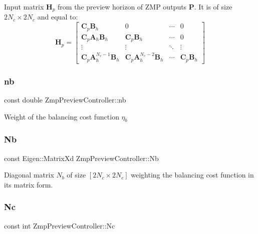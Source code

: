 Input matrix $\mathbf{H}_p$ from the preview horizon of Z\+MP outputs $\mathbf{P}$. It is of size $2N_c \times 2N_c$ and equal to\+: \[ \mathbf{H}_p = \left[\begin{array}{cccc} \mathbf{C}_p\mathbf{B}_h & 0 & \cdots & 0 \\ \mathbf{C}_p\mathbf{A}_h\mathbf{B}_h & \mathbf{C}_p\mathbf{B}_h & \cdots & 0 \\ \vdots & \vdots & \ddots & \vdots \\ \mathbf{C}_p\mathbf{A}^{N_c-1}_h\mathbf{B}_h & \mathbf{C}_p\mathbf{A}^{N_c-2}_h\mathbf{B}_h & \cdots & \mathbf{C}_p\mathbf{B}_h \end{array}\right] \] \hypertarget{classZmpPreviewController_a6716ee4c94e6f91e608ee1e29fbc7051}{}\label{classZmpPreviewController_a6716ee4c94e6f91e608ee1e29fbc7051} 
\subsubsection{\texorpdfstring{nb}{nb}}
{\footnotesize\ttfamily const double Zmp\+Preview\+Controller\+::nb\hspace{0.3cm}{\ttfamily [private]}}

Weight of the balancing cost function $ \eta_b $ \hypertarget{classZmpPreviewController_abd345d397e99ae01ad4ea80cd9894802}{}\label{classZmpPreviewController_abd345d397e99ae01ad4ea80cd9894802} 
\subsubsection{\texorpdfstring{Nb}{Nb}}
{\footnotesize\ttfamily const Eigen\+::\+Matrix\+Xd Zmp\+Preview\+Controller\+::\+Nb\hspace{0.3cm}{\ttfamily [private]}}

Diagonal matrix $N_b$ of size $[2N_c \times 2N_c]$ weighting the balancing cost function in its matrix form. \hypertarget{classZmpPreviewController_af0c8b4aa92a6e3e95f80d81a8c91f693}{}\label{classZmpPreviewController_af0c8b4aa92a6e3e95f80d81a8c91f693} 
\subsubsection{\texorpdfstring{Nc}{Nc}}
{\footnotesize\ttfamily const int Zmp\+Preview\+Controller\+::\+Nc\hspace{0.3cm}{\ttfamily [private]}}

